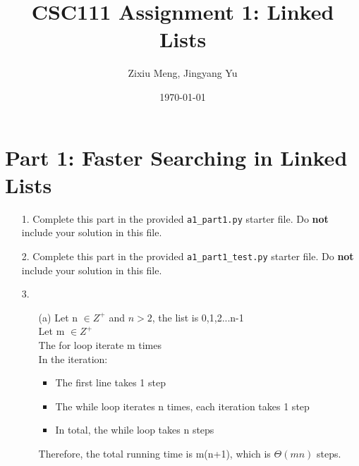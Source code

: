 \documentclass[fontsize=11pt]{article}
\title{CSC111 Assignment 1: Linked Lists}
\author{Zixiu Meng, Jingyang Yu}
\date{\today}
\begin{document}
    \maketitle

    \section*{Part 1: Faster Searching in Linked Lists}

    \begin{enumerate}

        \item[1.]
        Complete this part in the provided \texttt{a1\_part1.py} starter file.
        Do \textbf{not} include your solution in this file.

        \item[2.]
        Complete this part in the provided \texttt{a1\_part1\_test.py} starter file.
        Do \textbf{not} include your solution in this file.

        \item[3.]
        \begin{enumerate}

            \item[(a)]
            Let n $\in Z^+$ and $n>2$, the list is 0,1,2...n-1\\
            Let m $\in Z^+$\\
            The for loop iterate m times\\
            In the iteration:
            \begin{itemize}
                \item The first line takes 1 step
                \item The while loop iterates n times, each iteration takes 1 step
                \item In total, the while loop takes n steps
            \end{itemize}
            Therefore, the total running time is m(n+1), which is $\Theta(mn)$ steps.



\end{enumerate}
\end{enumerate}
\end{document}
